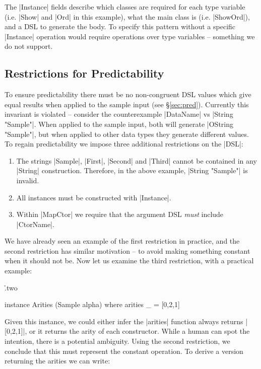 \documentclass{llncs}
\begin{document}
The |Instance| fields describe which classes are required for each type variable (i.e. |Show| and |Ord| in this example), what the main class is (i.e. |ShowOrd|), and a DSL to generate the body. To specify this pattern without a specific |Instance| operation would require operations over type variables -- something we do not support.

\subsection{Restrictions for Predictability}
\label{sec:predictability}

To ensure predictability there must be no non-congruent DSL values which give equal results when applied to the sample input (see \S\ref{sec:pred}). Currently this invariant is violated -- consider the counterexample |DataName| vs |String "Sample"|. When applied to the sample input, both will generate |OString "Sample"|, but when applied to other data types they generate different values. To regain predictability we impose three additional restrictions on the |DSL|:

\begin{enumerate}
\item The strings |Sample|, |First|, |Second| and |Third| cannot be contained in any |String| construction. Therefore, in the above example, |String "Sample"| is invalid.
\item All instances must be constructed with |Instance|.
\item Within |MapCtor| we require that the argument DSL \textit{must} include |CtorName|.
\end{enumerate}

We have already seen an example of the first restriction in practice, and the second restriction has similar motivation -- to avoid making something constant when it should not be. Now let us examine the third restriction, with a practical example:

\h{.two}\begin{code}
instance Arities (Sample alpha) where
    arities _ = [0,2,1]
\end{code}

Given this instance, we could either infer the |arities| function always returns |[0,2,1]|, or it returns the arity of each constructor. While a human can spot the intention, there is a potential ambiguity. Using the second restriction, we conclude that this must represent the constant operation. To derive a version returning the arities we can write:
\end{document}
